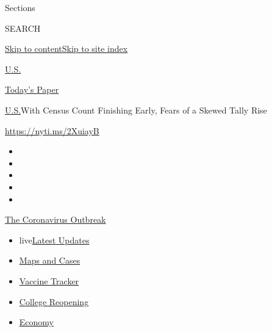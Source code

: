 Sections

SEARCH

\protect\hyperlink{site-content}{Skip to
content}\protect\hyperlink{site-index}{Skip to site index}

\href{https://www.nytimes3xbfgragh.onion/section/us}{U.S.}

\href{https://myaccount.nytimes3xbfgragh.onion/auth/login?response_type=cookie\&client_id=vi}{}

\href{https://www.nytimes3xbfgragh.onion/section/todayspaper}{Today's
Paper}

\href{/section/us}{U.S.}\textbar{}With Census Count Finishing Early,
Fears of a Skewed Tally Rise

\url{https://nyti.ms/2XuiayB}

\begin{itemize}
\item
\item
\item
\item
\item
\end{itemize}

\href{https://www.nytimes3xbfgragh.onion/news-event/coronavirus?action=click\&pgtype=Article\&state=default\&region=TOP_BANNER\&context=storylines_menu}{The
Coronavirus Outbreak}

\begin{itemize}
\tightlist
\item
  live\href{https://www.nytimes3xbfgragh.onion/2020/08/04/world/coronavirus-cases.html?action=click\&pgtype=Article\&state=default\&region=TOP_BANNER\&context=storylines_menu}{Latest
  Updates}
\item
  \href{https://www.nytimes3xbfgragh.onion/interactive/2020/us/coronavirus-us-cases.html?action=click\&pgtype=Article\&state=default\&region=TOP_BANNER\&context=storylines_menu}{Maps
  and Cases}
\item
  \href{https://www.nytimes3xbfgragh.onion/interactive/2020/science/coronavirus-vaccine-tracker.html?action=click\&pgtype=Article\&state=default\&region=TOP_BANNER\&context=storylines_menu}{Vaccine
  Tracker}
\item
  \href{https://www.nytimes3xbfgragh.onion/2020/08/02/us/covid-college-reopening.html?action=click\&pgtype=Article\&state=default\&region=TOP_BANNER\&context=storylines_menu}{College
  Reopening}
\item
  \href{https://www.nytimes3xbfgragh.onion/live/2020/08/04/business/stock-market-today-coronavirus?action=click\&pgtype=Article\&state=default\&region=TOP_BANNER\&context=storylines_menu}{Economy}
\end{itemize}

